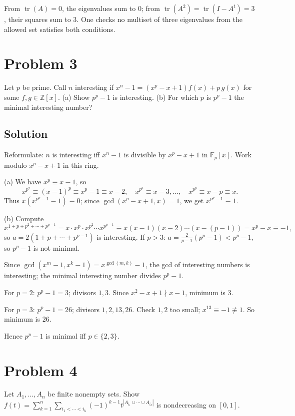 \documentclass{article}
\begin{document}
From $\operatorname{tr}(A) = 0$, the eigenvalues sum to $0$; from $\operatorname{tr}(A^2) = \operatorname{tr}(I - A^t) = 3$, their squares sum to $3$. One checks no multiset of three eigenvalues from the allowed set satisfies both conditions.

\section*{Problem 3}
Let $p$ be prime. Call $n$ interesting if $x^n - 1 = (x^p - x + 1)f(x) + p\, g(x)$ for some $f, g \in \mathbb{Z}[x]$.
(a) Show $p^p - 1$ is interesting. (b) For which $p$ is $p^p - 1$ the minimal interesting number?

\subsection*{Solution}
Reformulate: $n$ is interesting iff $x^n - 1$ is divisible by $x^p - x + 1$ in $\mathbb{F}_p[x]$. Work modulo $x^p - x + 1$ in this ring.

(a) We have $x^p \equiv x - 1$, so
\[
x^{p^2} \equiv (x-1)^p \equiv x^p - 1 \equiv x - 2, \quad x^{p^3} \equiv x - 3, \ldots, \quad x^{p^p} \equiv x - p \equiv x.
\]
Thus $x(x^{p^p - 1} - 1) \equiv 0$; since $\gcd(x^p - x + 1, x) = 1$, we get $x^{p^p - 1} \equiv 1$.

(b) Compute
\[
x^{1 + p + p^2 + \cdots + p^{p-1}} = x \cdot x^p \cdot x^{p^2} \cdots x^{p^{p-1}} \equiv x(x-1)(x-2)\cdots(x-(p-1)) = x^p - x \equiv -1,
\]
so $a = 2(1 + p + \cdots + p^{p-1})$ is interesting. If $p > 3$: $a = \tfrac{2}{p-1}(p^p - 1) < p^p - 1$, so $p^p - 1$ is not minimal.

Since $\gcd(x^m - 1, x^k - 1) = x^{\gcd(m,k)} - 1$, the gcd of interesting numbers is interesting; the minimal interesting number divides $p^p - 1$.

For $p = 2$: $p^p - 1 = 3$; divisors $1, 3$. Since $x^2 - x + 1 \nmid x - 1$, minimum is $3$.

For $p = 3$: $p^p - 1 = 26$; divisors $1, 2, 13, 26$. Check $1, 2$ too small; $x^{13} \equiv -1 \not\equiv 1$. So minimum is $26$.

Hence $p^p - 1$ is minimal iff $p \in \{2, 3\}$.

\section*{Problem 4}
Let $A_1, \ldots, A_n$ be finite nonempty sets. Show $f(t) = \sum_{k=1}^n \sum_{i_1 < \cdots < i_k} (-1)^{k-1} t^{|A_{i_1} \cup \cdots \cup A_{i_k}|}$ is nondecreasing on $[0,1]$.
\end{document}
